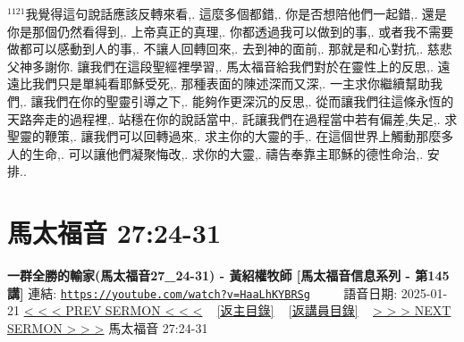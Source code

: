 \documentclass{book}
\begin{document}
$^{1121}$我覺得這句說話應該反轉來看,.
這麼多個都錯,.
你是否想陪他們一起錯,.
還是你是那個仍然看得到,.
上帝真正的真理,.
你都透過我可以做到的事,.
或者我不需要做都可以感動到人的事,.
不讓人回轉回來,.
去到神的面前,.
那就是和心對抗,.
慈悲父神多謝你.
讓我們在這段聖經裡學習,.
馬太福音給我們對於在靈性上的反思,.
遠遠比我們只是單純看耶穌受死,.
那種表面的陳述深而又深,.
一主求你繼續幫助我們,.
讓我們在你的聖靈引導之下,.
能夠作更深沉的反思,.
從而讓我們往這條永恆的天路奔走的過程裡,.
站穩在你的說話當中,.
託讓我們在過程當中若有偏差,失足,.
求聖靈的鞭策,.
讓我們可以回轉過來,.
求主你的大靈的手,.
在這個世界上觸動那麼多人的生命,.
可以讓他們凝聚悔改,.
求你的大靈,.
禱告奉靠主耶穌的德性命治,.
安排..
\newpage



\section{馬太福音 27:24-31}
\label{sec:HaaLhKYBRSg}
\textbf{一群全勝的輸家(馬太福音27\_24-31) - 黃紹權牧師  [馬太福音信息系列 - 第145講]}
\newline
\newline
連結: \href{https://youtube.com/watch?v=HaaLhKYBRSg}{\texttt{https://youtube.com/watch?v=HaaLhKYBRSg}} ~~~~ 語音日期: 2025-01-21
\newline
\newline
\hyperref[sec:ZN4O4BAmHMA]{< < < PREV SERMON < < <}
~
\hyperlink{toc}{[返主目錄]}
~
\hyperref[ch:preacher18]{[返講員目錄]}
~
\hyperref[sec:oCpi7n8ictU]{> > > NEXT SERMON > > >}
\newline
\newline
馬太福音 27:24-31
\newline
\end{document}
